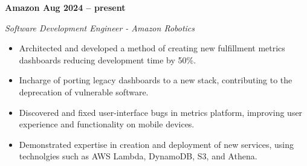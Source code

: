\vspace{0.1cm}
\textbf{Amazon \hfill Aug 2024 -- present} \par
\textit{Software Development Engineer - Amazon Robotics} \par
\begin{itemize}
	\item Architected and developed a method of creating new fulfillment metrics dashboards reducing development time by 50\%.
    \item Incharge of porting legacy dashboards to a new stack, contributing to the deprecation of vulnerable software.
    \item Discovered and fixed user-interface bugs in metrics platform, improving user experience and functionality on mobile devices.
    \item Demonstrated expertise in creation and deployment of new services, using technolgies such as AWS Lambda, DynamoDB, S3, and Athena.
\end{itemize} \par